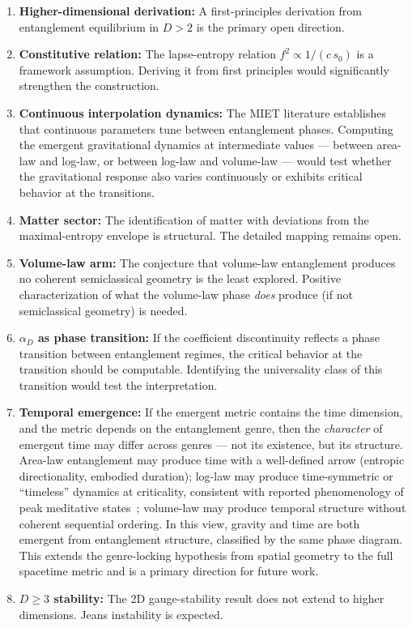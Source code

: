 \documentclass[aps,prd,twocolumn,superscriptaddress,nofootinbib,floatfix]{revtex4-2}
\newcommand{\sn}{s_0}
\begin{document}
\begin{enumerate}
\item \textbf{Higher-dimensional derivation:} A first-principles derivation from entanglement equilibrium in $D > 2$ is the primary open direction.

\item \textbf{Constitutive relation:} The lapse-entropy relation $f^2 \propto 1/(c\,\sn)$ is a framework assumption. Deriving it from first principles would significantly strengthen the construction.

\item \textbf{Continuous interpolation dynamics:} The MIET literature establishes that continuous parameters tune between entanglement phases. Computing the emergent gravitational dynamics at intermediate values --- between area-law and log-law, or between log-law and volume-law --- would test whether the gravitational response also varies continuously or exhibits critical behavior at the transitions.

\item \textbf{Matter sector:} The identification of matter with deviations from the maximal-entropy envelope is structural. The detailed mapping remains open.

\item \textbf{Volume-law arm:} The conjecture that volume-law entanglement produces no coherent semiclassical geometry is the least explored. Positive characterization of what the volume-law phase \emph{does} produce (if not semiclassical geometry) is needed.

\item \textbf{$\alpha_D$ as phase transition:} If the coefficient discontinuity reflects a phase transition between entanglement regimes, the critical behavior at the transition should be computable. Identifying the universality class of this transition would test the interpretation.

\item \textbf{Temporal emergence:} If the emergent metric contains the time dimension, and the metric depends on the entanglement genre, then the \emph{character} of emergent time may differ across genres --- not its existence, but its structure. Area-law entanglement may produce time with a well-defined arrow (entropic directionality, embodied duration); log-law may produce time-symmetric or ``timeless'' dynamics at criticality, consistent with reported phenomenology of peak meditative states~\cite{Wittmann2023}; volume-law may produce temporal structure without coherent sequential ordering. In this view, gravity and time are both emergent from entanglement structure, classified by the same phase diagram. This extends the genre-locking hypothesis from spatial geometry to the full spacetime metric and is a primary direction for future work.

\item \textbf{$D \geq 3$ stability:} The 2D gauge-stability result does not extend to higher dimensions. Jeans instability is expected.
\end{enumerate}
\end{document}
